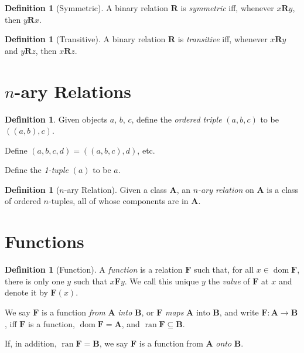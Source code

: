 \documentclass{article}
\theoremstyle{definition}
\newtheorem{definition}[axiom]{Definition}
\newcommand{\dom}{\ensuremath{\operatorname{dom}}}
\newcommand{\ran}{\ensuremath{\operatorname{ran}}}
\begin{document}
    \begin{definition}[Symmetric]
        A binary relation $\mathbf{R}$ is \emph{symmetric} iff, whenever $x\mathbf{R}y$, then $y\mathbf{R}x$.
    \end{definition}

    \begin{definition}[Transitive]
        A binary relation $\mathbf{R}$ is \emph{transitive} iff, whenever $x\mathbf{R}y$ and $y\mathbf{R}z$,
        then $x\mathbf{R}z$.
    \end{definition}

    \section{$n$-ary Relations}

    \begin{definition}
        Given objects $a$, $b$, $c$, define the \emph{ordered triple}
        $(a,b,c)$ to be $((a,b),c)$.

        Define $(a,b,c,d) = ((a,b,c),d)$, etc.

        Define the \emph{1-tuple} $(a)$ to be $a$.
    \end{definition}

    \begin{definition}[$n$-ary Relation]
        Given a class $\mathbf{A}$, an \emph{$n$-ary relation} on $\mathbf{A}$ is a class of ordered
        $n$-tuples, all of whose components are in $\mathbf{A}$.
    \end{definition}

    \section{Functions}

    \begin{definition}[Function]
        A \emph{function} is a relation $\mathbf{F}$ such that, for all $x \in \dom \mathbf{F}$,
        there is only one $y$ such that $x \mathbf{F} y$. We call this unique $y$ the \emph{value}
        of $\mathbf{F}$ at $x$ and denote it by $\mathbf{F}(x)$.

        We say $\mathbf{F}$ is a function \emph{from} $\mathbf{A}$ \emph{into} $\mathbf{B}$,
        or $\mathbf{F}$ \emph{maps} $\mathbf{A}$ into $\mathbf{B}$, and write $\mathbf{F} : \mathbf{A}
        \rightarrow \mathbf{B}$, iff $\mathbf{F}$ is a function, $\dom \mathbf{F} = \mathbf{A}$,
        and $\ran \mathbf{F} \subseteq \mathbf{B}$.

        If, in addition, $\ran \mathbf{F} = \mathbf{B}$, we say $\mathbf{F}$ is a function from $\mathbf{A}$
        \emph{onto} $\mathbf{B}$.
    \end{definition}
\end{document}
